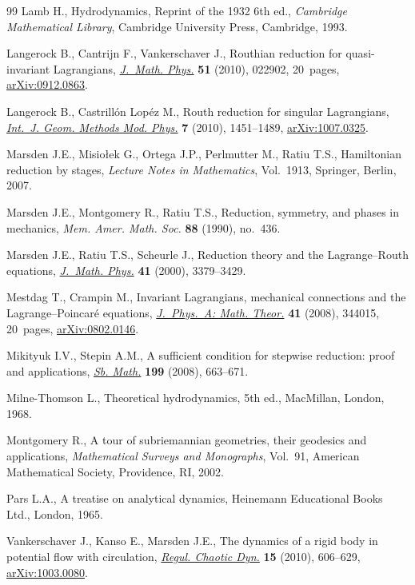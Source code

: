 \documentclass[pdftex]{sigma}
\begin{document}
\begin{thebibliography}{99}
Lamb H.,
Hydrodynamics, Reprint of the 1932 6th ed.,
{\it Cambridge Mathematical Library}, Cambridge University Press, Cambridge, 1993.

Langerock B., Cantrijn F., Vankerschaver J.,
Routhian reduction for quasi-invariant Lagrangians,
\href{http://dx.doi.org/10.1063/1.3277181}{{\em J.~Math. Phys.}} {\bf 51} (2010), 022902, 20~pages,
\href{http://arxiv.org/abs/0912.0863}{arXiv:0912.0863}.

Langerock B., Castrill{\'o}n Lop{\'e}z M.,
Routh reduction for singular Lagrangians,
\href{http://dx.doi.org/10.1142/S0219887810004907}{{\it Int.~J. Geom. Methods Mod. Phys.}} {\bf 7} (2010), 1451--1489,
\href{http://arxiv.org/abs/1007.0325}{arXiv:1007.0325}.

 Marsden J.E., Misio{\l}ek G., Ortega J.P., Perlmutter M.,   Ratiu T.S.,
Hamiltonian reduction by stages,
{\it Lecture  Notes in Mathematics}, Vol.~1913, Springer, Berlin, 2007.

 Marsden J.E., Montgomery R., Ratiu T.S.,
Reduction, symmetry, and phases in mechanics,
{\em Mem. Amer. Math. Soc.} {\bf 88} (1990), no.~436.

 Marsden J.E., Ratiu T.S., Scheurle J.,
Reduction theory and the Lagrange--Routh equations,
\href{http://dx.doi.org/10.1063/1.533317}{{\em J.~Math. Phys.}} {\bf  41} (2000), 3379--3429.

Mestdag T., Crampin M.,
Invariant Lagrangians, mechanical connections and the Lagrange--Poincar{\'e} equations,
\href{http://dx.doi.org/10.1088/1751-8113/41/34/344015}{{\em J.~Phys.~A: Math. Theor.}} {\bf 41} (2008), 344015, 20~pages,
\href{http://arxiv.org/abs/0802.0146}{arXiv:0802.0146}.

 Mikityuk I.V., Stepin A.M.,
A suf\/f\/icient condition for stepwise reduction: proof and applications,
\href{http://dx.doi.org/10.1070/SM2008v199n05ABEH003938}{{\em Sb. Math.}} {\bf 199} (2008),  663--671.

Milne-Thomson L.,
Theoretical hydrodynamics, 5th ed.,
MacMillan, London, 1968.

Montgomery R.,
A tour of subriemannian geometries, their geodesics and applications,
 {\em Mathematical Surveys and Monographs}, Vol.~91, American Mathematical Society, Providence, RI, 2002.

 Pars L.A.,
A treatise on analytical dynamics,
Heinemann Educational Books Ltd., London, 1965.

Vankerschaver J., Kanso E., Marsden J.E.,
The dynamics of a rigid body in potential f\/low with circulation,
\href{http://dx.doi.org/10.1134/S1560354710040143}{{\em Regul. Chaotic Dyn.}} {\bf 15} (2010), 606--629,
\href{http://arxiv.org/abs/1003.0080}{arXiv:1003.0080}.

\end{thebibliography}\LastPageEnding
\end{document}
